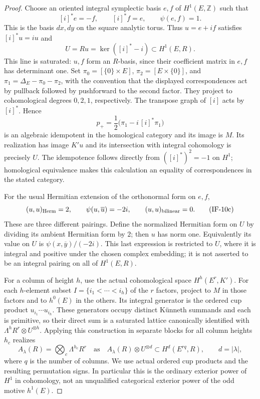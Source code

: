 \documentclass[11pt,a4paper]{article}
\theoremstyle{definition}
\theoremstyle{remark}
\begin{document}
\begin{proof}
Choose an oriented integral symplectic basis $e,f$ of $H^1(E,\mathbb Z)$
such that
\[
 [i]^*e=-f,\qquad [i]^*f=e,\qquad
 \psi(e,f)=1.
\]
This is the basis $dx,dy$ on the square analytic torus. Thus
$u=e+if$ satisfies $[i]^*u=iu$ and
\[
 U=R u=\ker([i]^*-i)\subset H^1(E,R).
                                                               \tag{IF-10a}
\]
This line is saturated: $u,f$ form an $R$-basis, since their coefficient
matrix in $e,f$ has determinant one. Set
$\pi_0=[\{0\}\times E]$, $\pi_2=[E\times\{0\}]$, and
$\pi_1=\Delta_E-\pi_0-\pi_2$, with the convention that the displayed
correspondences act by pullback followed by pushforward to the second
factor. They project to cohomological degrees $0,2,1$, respectively.
The transpose graph of $[i]$ acts by $[i]^*$. Hence
\[
 p_+=\frac{1}{2}\bigl(\pi_1-i\,[i]^*\pi_1\bigr)
                                                               \tag{IF-10b}
\]
is an algebraic idempotent in the homological category and its image is
$M$. Its realization has image $K'u$ and its intersection with integral
cohomology is precisely $U$. The idempotence follows directly from
$([i]^*)^2=-1$ on $H^1$; homological equivalence makes this calculation
an equality of correspondences in the stated category.

For the usual Hermitian extension of the orthonormal form on $e,f$,
\[
 (u,u)_{\rm Herm}=2,\qquad
 \psi(u,\overline u)=-2i,\qquad
 (u,u)_{\rm bilinear}=0.                         \tag{IF-10c}
\]
These are three different pairings. Define the normalized Hermitian
form on $U$ by dividing its ambient Hermitian form by $2$; then $u$ has
norm one. Equivalently its value on $U$ is
$\psi(x,\overline y)/(-2i)$. This last expression is restricted to
$U$, where it is integral and positive under the chosen complex
embedding; it is not asserted to be an integral pairing on all of
$H^1(E,R)$.

For a column of height $h$, use the actual cohomological space
$H^h(E^r,K')$. For each $h$-element subset
$I=\{i_1<\cdots<i_h\}$ of the $r$ factors, project to $M$ in those
factors and to $h^0(E)$ in the others. Its integral generator is the
ordered cup product $u_{i_1}\cdots u_{i_h}$. These generators occupy
distinct K\"unneth summands and each is primitive, so their direct sum
is a saturated lattice canonically identified with
$\Lambda^h R^r\otimes U^{\otimes h}$. Applying this construction in
separate blocks for all column heights $h_c$ realizes
\[
 A_\lambda(R)=\bigotimes_c\Lambda^{h_c}R^r
 \quad\text{as}\quad
 A_\lambda(R)\otimes U^{\otimes d}
 \subset H^d(E^{rq},R),\qquad d=|\lambda|,
                                                               \tag{IF-10d}
\]
where $q$ is the number of columns. We use actual ordered cup products
and the resulting permutation signs. In particular this is the ordinary
exterior power of $H^1$ in cohomology, not an unqualified categorical
exterior power of the odd motive $h^1(E)$.


\end{proof}
\end{document}
